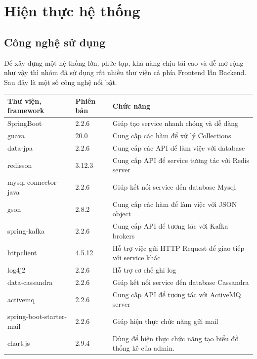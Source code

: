 \chapter{Hiện thực hệ thống}

\section{Công nghệ sử dụng}

	Để xây dựng một hệ thống lớn, phức tạp, khả năng chịu tải cao và dễ mở rộng như vậy thì nhóm đã sử dụng rất nhiều thư viện cả phía Frontend lẫn Backend. Sau đây là một số công nghệ nổi bật.
	
	\newpage
	
	\begin{table}[H]
		\centering\begin{tabular}{|l|l|m{20em}|}
			\hline 
			\textbf{Thư viện, framework} & \textbf{Phiên bản} & \textbf{Chức năng}\\
			\hline 
			SpringBoot & 2.2.6 & Giúp tạo service nhanh chóng và dễ dàng  \\
			\hline 
			guava & 20.0 & Cung cấp các hàm để xử lý Collections \\
			\hline 
			data-jpa & 2.2.6 & Cung cấp các API để làm việc với database \\
			\hline 
			redisson & 3.12.3 & Cung cấp API để service tương tác với Redis server\\
			\hline 
			mysql-connector-java & 2.2.6 & Giúp kết nối service đến database Mysql \\
			\hline 
			gson & 2.8.2 & Cung cấp các hàm để làm việc với JSON object \\
			\hline 
			spring-kafka &  2.2.6 & Cung cấp API để tương tác với Kafka brokers \\
			\hline 
			httpclient & 4.5.12 & Hỗ trợ việc gửi HTTP Request để giao tiếp với service khác \\
			\hline 
			log4j2 &  2.2.6 & Hỗ trợ cơ chế ghi log \\
			\hline 
			data-cassandra & 2.2.6 & Giúp kết nối service đến database Cassandra \\
			\hline 
			activemq & 2.2.6  & Cung cấp API để tương tác với ActiveMQ server \\
			\hline 
			spring-boot-starter-mail & 2.2.6 & Giúp hiện thực chức năng gửi mail \\
			\hline
			chart.js & 2.9.4 & Dùng để hiện thực chức năng tạo biểu đồ thống kê của admin. \\

\end{tabular}
\end{table}
